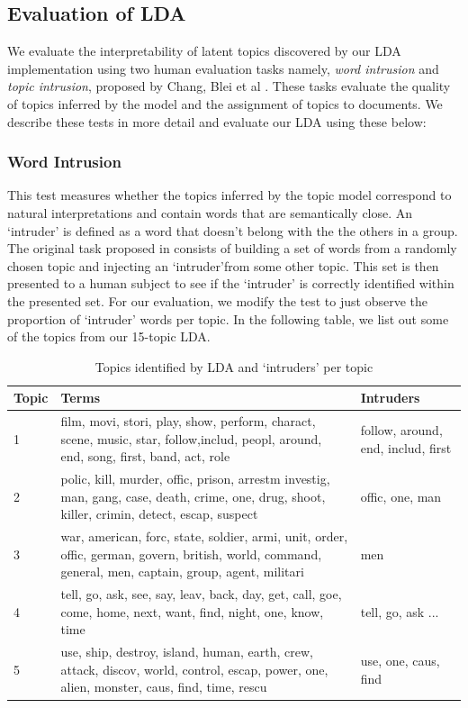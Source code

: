 \documentclass{article} %
\begin{document}
\subsection{Evaluation of LDA}

We evaluate the interpretability of latent topics discovered by our LDA
implementation using two human evaluation tasks namely, \textit{word intrusion}
and \textit{topic intrusion}, proposed by Chang, Blei et al \cite{tea-leaves}. 
These tasks evaluate the quality of topics inferred by the model and the 
assignment of topics to documents. We describe these tests in more detail and
evaluate our LDA using these below:

\subsubsection{Word Intrusion}
This test measures whether the topics inferred by the topic model correspond
to natural interpretations and contain words that are semantically close. An
`intruder' is defined as a word that doesn't belong with the the others in a 
group. The original task proposed in \cite{tea-leaves} consists of 
building a set of words from a randomly chosen topic and injecting an `intruder'from some other topic. This set is then presented to a human subject to see if 
the `intruder' is correctly identified within the presented set. For our 
evaluation, we modify the test to just observe the proportion of `intruder' 
words per topic. In the following table, we list out some of the topics 
from our 15-topic LDA.

\begin{table}[h]
\label{table:word-intrusion}
\begin{center}
\begin{tabular}{l|p{3.5in}|p{1.2in}}
Topic	& Terms	& Intruders \\ \hline
1 & film, movi, stori, play, show, perform, charact, scene, music, star, follow,includ, peopl, around, end, song, first, band, act, role & follow, around, end, includ, first \\
2 & polic, kill, murder, offic, prison, arrestm investig, man, gang, case,
death, crime, one, drug, shoot, killer, crimin, detect, escap, suspect & offic, one, man \\
3 & war, american, forc, state, soldier, armi, unit, order, offic, german,
govern, british, world, command, general, men, captain, group, agent, militari & men \\
4 & tell, go, ask, see, say, leav, back, day, get, call, goe, come, home, next,
want, find, night, one, know, time & tell, go, ask ... \\
5 & use, ship, destroy, island, human, earth, crew, attack, discov, world,
control, escap, power, one, alien, monster, caus, find, time, rescu & use, one,
caus, find \\ \hline 
\end{tabular}
\end{center}
\caption{Topics identified by LDA and `intruders' per topic}
\end{table}
\end{document}
